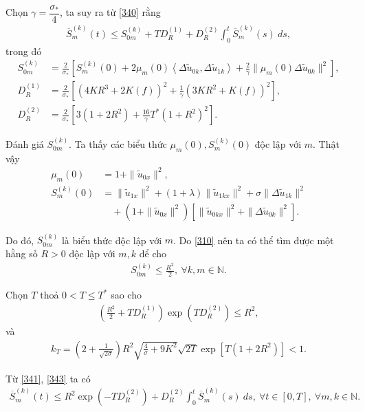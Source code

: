 \documentclass[12pt,a4paper]{article}
\def\N{\mathbb{N}}
\theoremstyle{definition}
\theoremstyle{definition}
\begin{document}
Chọn $\gamma = \dfrac{\sigma_*}{4}$, ta suy ra từ \eqref{340} rằng
\begin{align} \label{341}
    \overline{S}_m^{(k)}(t) \le S_{0m}^{(k)} + T D_R^{(1)} + D_R^{(2)} \int_0^t \overline{S}_m^{(k)}(s)\:ds,
\end{align}
trong đó
\begin{align*}
    S_{0m}^{(k)} &= \frac{2}{\sigma_*}\left[S_m^{(k)}(0) + 2 \mu_m(0) \left<\Delta \tilde{u}_{0k}, \Delta \tilde{u}_{1k}\right> + \frac{2}{\gamma} \| \mu_m(0) \Delta \tilde{u}_{0k} \|^2\right], \\
    D_R^{(1)} &= \frac{2}{\sigma_*}\left[(4KR^3 + 2K(f))^2 + \frac{1}{\gamma}(3KR^2 + K(f))^2\right], \\
    D_R^{(2)} &= \frac{2}{\sigma_*}\left[3(1+2R^2) + \frac{16}{\gamma}T^* (1+R^2)^2\right].
\end{align*}

Đánh giá $S_{0m}^{(k)}$. Ta thấy các biểu thức $\mu_m(0), S_m^{(k)}(0)$ độc lập với $m$. Thật vậy
\begin{align*}
    \mu_m(0) &= 1 + \|\tilde{u}_{0x}\|^2, \\
    S_m^{(k)}(0) &= \|\tilde{u}_{1x}\|^2 + (1 + \lambda) \|\tilde{u}_{1kx}\|^2 + \sigma \|\Delta \tilde{u}_{1k}\|^2 \\
                  &\quad + (1 + \|\tilde{u}_{0x}\|^2) \left[\|\tilde{u}_{0kx}\|^2 + \|\Delta\tilde{u}_{0k}\|^2\right].
\end{align*}

Do đó, $S_{0m}^{(k)}$ là biểu thức độc lập với $m$. Do \eqref{310} nên ta có thể tìm được một hằng số $R > 0$ độc lập với $m,k$ để cho
\begin{align} \label{341}
    S_{0m}^{(k)} \le \frac{R^2}{2}, \  \forall k, m \in \N.
\end{align}

Chọn $T$ thoả $0 < T \le T^*$ sao cho
\begin{align} \label{343}
    \left(\frac{R^2}{2} + TD_R^{(1)}\right) \exp \left(TD_R^{(2)}\right) \le R^2,
\end{align}
và
\begin{align} \label{344}
    k_T = \left(2 + \frac{1}{\sqrt{2\sigma}}\right) R^2 \sqrt{\frac{4}{\sigma} + 9K^2} \sqrt{2T} \exp \left[T(1+2R^2)\right] < 1.
\end{align}

Từ \eqref{341}, \eqref{343} ta có
\begin{align} \label{345}
    \overline{S}_m^{(k)}(t) \le R^2 \exp\left(-TD_R^{(2)}\right) + D_R^{(2)} \int_0^t \overline{S}_m^{(k)}(s)\:ds, \ \forall t \in [0,T],\ \forall m,k \in \N.
\end{align}
\end{document}

